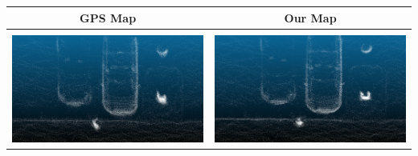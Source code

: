 \begin{table}[h]
    \centering
    {\small
        \begin{tabular}{cc}
            \textbf{GPS Map}                                                                       & \textbf{Our Map} \\
            \hline \hline
            \\
            \includegraphics[width=0.44\linewidth]{images/map_compare/kitti/cars/capture_gps.png}  &
            \includegraphics[width=0.44\linewidth]{images/map_compare/kitti/cars/capture_ours.png}                    \\


\end{tabular}}
\end{table}
